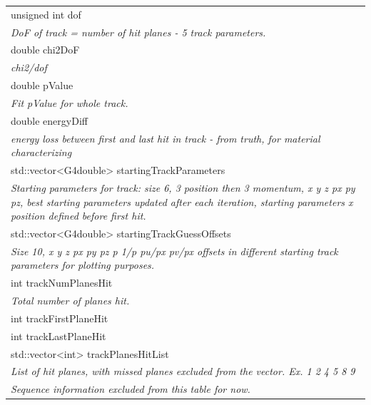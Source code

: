 \documentclass{article}
\begin{document}
\begin{longtable}{|p{16cm}|}
unsigned int dof \\
\textit{DoF of track = number of hit planes - 5 track parameters.} \\ \hline

double chi2DoF \\
\textit{chi2/dof} \\ \hline

double pValue \\
\textit{Fit pValue for whole track.} \\ \hline

double energyDiff \\
\textit{energy loss between first and last hit in track - from truth, for material characterizing} \\ \hline

std::vector\textless{}G4double\textgreater{} startingTrackParameters \\
\textit{Starting parameters for track: size 6, 3 position then 3 momentum, x y z px py pz, best starting parameters updated after each iteration, starting parameters x position defined before first hit.} \\ \hline

std::vector\textless{}G4double\textgreater{} startingTrackGuessOffsets \\
\textit{Size 10, x y z px py pz p 1/p pu/px pv/px offsets in different starting track parameters for plotting purposes.} \\ \hline

int trackNumPlanesHit \\ 
\textit{Total number of planes hit.} \\ \hline

int trackFirstPlaneHit \\ \hline

int trackLastPlaneHit \\ \hline

std::vector\textless{}int\textgreater{} trackPlanesHitList \\
\textit{List of hit planes, with missed planes excluded from the vector. Ex. 1 2 4 5 8 9} \\ \hline

\textit{Sequence information excluded from this table for now.} \\ \hline


\end{longtable}
\end{document}
